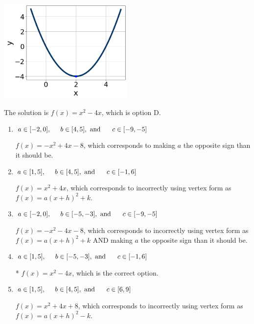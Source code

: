 \documentclass{extbook}[14pt]
\begin{document}
\begin{enumerate}
{\begin{center}
    \includegraphics[width=0.5\textwidth]{../Figures/quadraticGraphToEquationB.png}
\end{center}


The solution is \( f(x) = x^{2} -4 x \), which is option D.\begin{enumerate}[label=\Alph*.]
\item \( a \in [-2, 0], \hspace*{5mm} b \in [4, 5], \text{ and } \hspace*{5mm} c \in [-9, -5] \)

$f(x)=-x^{2} +4 x -8$, which corresponds to making $a$ the opposite sign than it should be.
\item \( a \in [1, 5], \hspace*{5mm} b \in [4, 5], \text{ and } \hspace*{5mm} c \in [-1, 6] \)

$f(x)=x^{2} +4 x$, which corresponds to incorrectly using vertex form as $f(x) = a(x+h)^2+k$.
\item \( a \in [-2, 0], \hspace*{5mm} b \in [-5, -3], \text{ and } \hspace*{5mm} c \in [-9, -5] \)

$f(x)=-x^{2} -4 x -8$, which corresponds to incorrectly using vertex form as $f(x) = a(x+h)^2+k$ AND making $a$ the opposite sign than it should be.
\item \( a \in [1, 5], \hspace*{5mm} b \in [-5, -3], \text{ and } \hspace*{5mm} c \in [-1, 6] \)

* $f(x)=x^{2} -4 x$, which is the correct option.
\item \( a \in [1, 5], \hspace*{5mm} b \in [4, 5], \text{ and } \hspace*{5mm} c \in [6, 9] \)

$f(x)=x^{2} +4 x + 8$, which corresponds to incorrectly using vertex form as $f(x) = a(x+h)^2 - k$.
\end{enumerate}

}
\end{enumerate}
\end{document}
